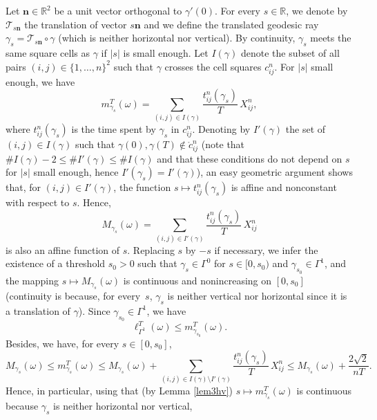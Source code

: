\documentclass[10pt]{amsart}
\def\R{\mathbb{R}}
\theoremstyle{definition}
\begin{document}
Let $\boldsymbol{n}\in\R^2$ be a unit vector orthogonal to $\gamma'(0)$.
For every $s\in\R$, we denote by $\mathcal{T}_{s\boldsymbol{n}}$ the translation of vector $s\boldsymbol{n}$ and we define the translated geodesic ray $\gamma_s= \mathcal{T}_{s\boldsymbol{n}} \circ \gamma$ (which is neither horizontal nor vertical). By continuity, $\gamma_s$ meets the same square cells as $\gamma$ if $\vert s\vert$ is small enough. Let $I(\gamma)$ denote the subset of all pairs $(i,j)\in\{1,\ldots,n\}^2$ such that $\gamma$ crosses the cell squares $c_{ij}^n$. For $\vert s\vert$ small enough, we have
\[
m^T_{\gamma_s}(\omega)=\sum_{(i,j)\in I(\gamma)} \frac{t_{ij}^n(\gamma_s)}{T}\, X_{ij}^n,
\]
where $t_{ij}^n(\gamma_s)$ is the time spent by $\gamma_s$ in $c_{ij}^n$.
Denoting by $I'(\gamma)$ the set of $(i,j)\in I(\gamma)$ such that $\gamma(0), \gamma(T) \notin \mathring{c}_{ij}^n$ (note that $\# I(\gamma) - 2 \leq \# I '(\gamma) \leq \# I(\gamma)$ {and that these conditions do not depend on $s$ for $\vert s\vert$ small enough, hence $I '(\gamma_s)=I '(\gamma)$}), an easy geometric argument shows that, for $(i,j)\in I'(\gamma)$, the function $s\mapsto t_{ij}^n(\gamma_s)$ is affine and nonconstant with respect to $s$.
Hence,
\begin{equation}\label{defMom}
M_{\gamma_s}(\omega) = \sum_{(i,j) \in I'(\gamma)} \frac{t_{ij}^n(\gamma_s)}{T}\,X_{ij}^n
\end{equation}
is also an affine function of $s$.
Replacing $s$ by $-s$ if necessary, we infer the existence of a threshold $s_0 >0$ such that {$\gamma_s\in\Gamma^0$ for $s\in[0,s_0)$} and $\gamma_{s_0}\in\Gamma^1$, and the mapping $s\mapsto M_{\gamma_s}(\omega)$ is {continuous and nonincreasing} on $[0,s_0]$ {(continuity is because, for every~$s$, $\gamma_s$ is neither vertical nor horizontal since it is a translation of $\gamma$)}.
Since $\gamma_{s_0}\in\Gamma^1$, we have
\begin{equation}\label{11:19}
\ell_{\Gamma^1}^T(\omega) \leq m^T_{\gamma_{s_0}} (\omega).
\end{equation}
Besides, we have, {for every $s\in[0,s_0]$,}
\begin{equation}\label{MTforalls}
M_{\gamma_s}(\omega)\leq m^T_{\gamma_s}(\omega) \leq M_{\gamma_s}(\omega) + \sum_{(i,j) \in I(\gamma) \setminus I'(\gamma) } \frac{t_{ij}^n(\gamma_s)}{T}\, X_{ij}^n \leq M_{\gamma_s}(\omega) + \frac{2 \sqrt{2}}{nT}.
\end{equation}
Hence, in particular, {using that (by Lemma \ref{lem3hv}) $s\mapsto m^T_{\gamma_s} (\omega)$ is continuous because $\gamma_s$ is neither horizontal nor vertical,}
\end{document}
